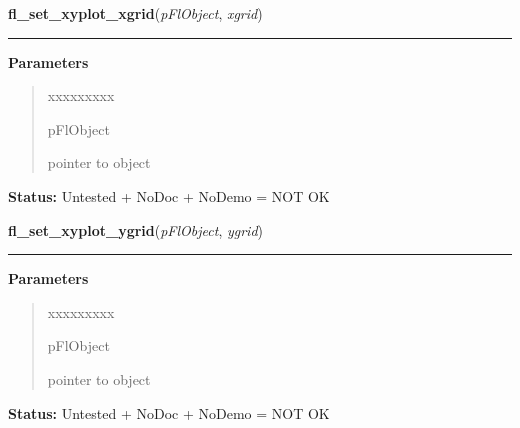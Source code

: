 \hspace{.8\funcindent}\begin{boxedminipage}{\funcwidth}

    \raggedright \textbf{fl\_set\_xyplot\_xgrid}(\textit{pFlObject}, \textit{xgrid})

    \vspace{-1.5ex}

    \rule{\textwidth}{0.5\fboxrule}
\setlength{\parskip}{2ex}
\setlength{\parskip}{1ex}
      \textbf{Parameters}
      \vspace{-1ex}

      \begin{quote}
        \begin{Ventry}{xxxxxxxxx}

          \item[pFlObject]

          pointer to object

        \end{Ventry}

      \end{quote}

\textbf{Status:} Untested + NoDoc + NoDemo = NOT OK



    \end{boxedminipage}

    \label{xformslib:flxyplot:fl_set_xyplot_ygrid}

    \vspace{0.5ex}

\hspace{.8\funcindent}\begin{boxedminipage}{\funcwidth}

    \raggedright \textbf{fl\_set\_xyplot\_ygrid}(\textit{pFlObject}, \textit{ygrid})

    \vspace{-1.5ex}

    \rule{\textwidth}{0.5\fboxrule}
\setlength{\parskip}{2ex}
\setlength{\parskip}{1ex}
      \textbf{Parameters}
      \vspace{-1ex}

      \begin{quote}
        \begin{Ventry}{xxxxxxxxx}

          \item[pFlObject]

          pointer to object

        \end{Ventry}

      \end{quote}

\textbf{Status:} Untested + NoDoc + NoDemo = NOT OK



    \end{boxedminipage}

